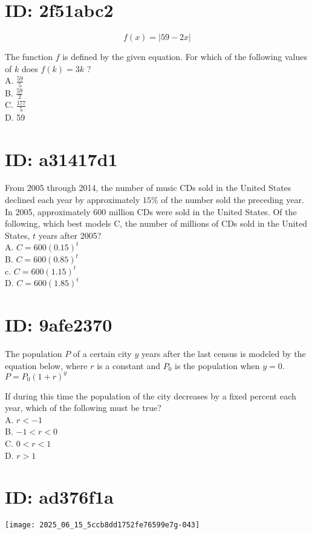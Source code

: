 \section*{ID: 2f51abc2}
$$
f(x)=|59-2 x|
$$

The function $f$ is defined by the given equation. For which of the following values of $k$ does $f(k)=3 k$ ?\\
A. $\frac{59}{5}$\\
B. $\frac{59}{2}$\\
C. $\frac{177}{5}$\\
D. 59

\section*{ID: a31417d1}
From 2005 through 2014, the number of music CDs sold in the United States declined each year by approximately $15 \%$ of the number sold the preceding year. In 2005, approximately 600 million CDs were sold in the United States. Of the following, which best models C, the number of millions of CDs sold in the United States, $t$ years after 2005?\\
A. $C=600(0.15)^{t}$\\
B. $C=600(0.85)^{t}$\\
c. $C=600(1.15)^{t}$\\
D. $C=600(1.85)^{t}$

\section*{ID: 9afe2370}
The population $P$ of a certain city $y$ years after the last census is modeled by the equation below, where $r$ is a constant and $P_{0}$ is the population when $y=0$.\\
$P=P_{0}(1+r)^{y}$

If during this time the population of the city decreases by a fixed percent each year, which of the following must be true?\\
A. $r<-1$\\
B. $-1<r<0$\\
C. $0<r<1$\\
D. $r>1$

\section*{ID: ad376f1a}
\begin{center}
\texttt{[image: 2025\_06\_15\_5ccb8dd1752fe76599e7g-043]}
\end{center}

